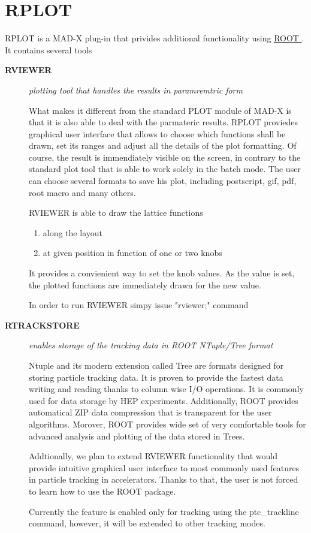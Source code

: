 
\section{RPLOT}

RPLOT is a MAD-X plug-in that privides additional functionality using
\href{http://root.cern.ch}{ ROOT }.  It contains several tools   

\begin{description}

\item[\textbf{ RVIEWER }] 
\textit{ plotting tool that handles the results in paramremtric form }

What makes it different      from the standard PLOT module of MAD-X is
that it is also able to      deal with the parmateric results. RPLOT
proviedes graphical user interface      that allows to choose which
functions shall be drawn, set its ranges     and adjust all the details
of the plot formatting. Of course, the result     is immendiately
visible on the screen, in contrary to the standard plot tool     that is
able to work solely in the batch mode. The user can choose several
formats to save his plot, including postscript, gif, pdf, root macro and
many      others.       

RVIEWER is able to draw the lattice functions     
\begin{enumerate}
   \item  along the layout 
   \item  at given position in function of one or two knobs  
\end{enumerate}     

It provides a convienient way to set the knob values. As the value is
set,      the plotted functions are immediately drawn for the new value.            

In order to run RVIEWER simpy issue "rviewer;" command        

\item[\textbf{ RTRACKSTORE }] 
\textit{ enables storage of the tracking data in ROOT NTuple/Tree format }

Ntuple and its modern extension called Tree are formats designed
for storing particle tracking data. It is proven to provide       the
fastest data writing and reading thanks to column wise       I/O
operations. It is commonly used for data storage by HEP
experiments. Additionally, ROOT provides automatical        ZIP data
compression that is transparent for the user algorithms.
Morover, ROOT provides wide set of very comfortable tools       for
advanced analysis and plotting of the data stored in Trees.    

Addtionally, we plan to extend RVIEWER functionality that would provide
intuitive graphical user interface to most commonly used       features
in particle tracking in accelerators. Thanks to that,       the user is
not forced to learn how to use the ROOT package.    

Currently the feature is enabled only for tracking using        the
ptc\_trackline command, however, it will be extended to       other
tracking modes.           
\end{description}

